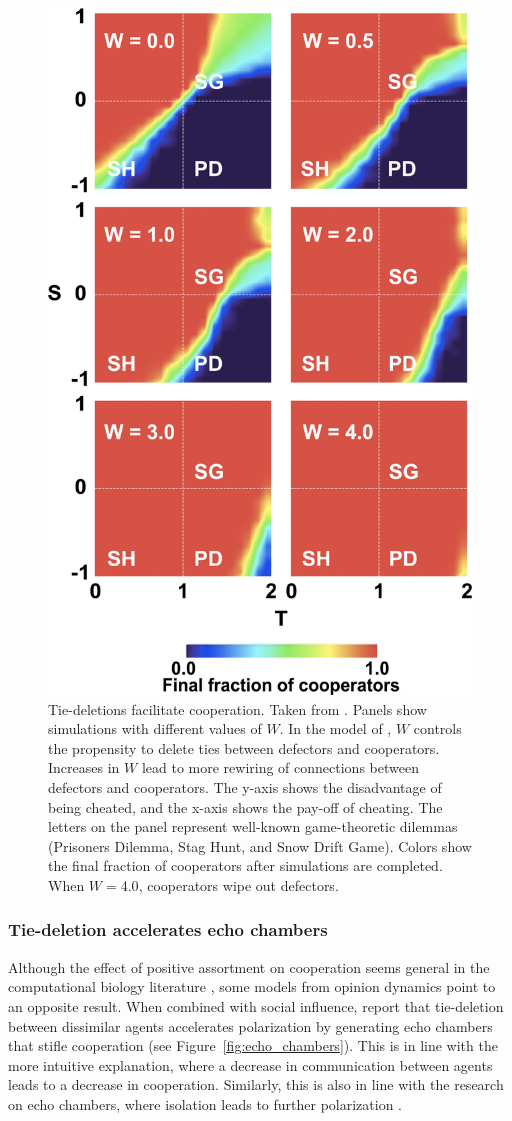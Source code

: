 \documentclass[11pt]{article}
\begin{document}
\begin{figure}[H]
    \centering
    \includegraphics[width=.4\linewidth]{../plots/references/santos.png}
  \caption{Tie-deletions facilitate cooperation. Taken from \protect{}. Panels show simulations with different values of $W$. In the model of \protect{}, $W$ controls the propensity to delete ties between defectors and cooperators. Increases in $W$ lead to more rewiring of connections between defectors and cooperators. The y-axis shows the disadvantage of being cheated, and the x-axis shows the pay-off of cheating. The letters on the panel represent well-known game-theoretic dilemmas (Prisoners Dilemma, Stag Hunt, and Snow Drift Game). Colors show the final fraction of cooperators after simulations are completed. When $W = 4.0$, cooperators wipe out defectors. }
  \label{fig:santos}
\end{figure}

\subsubsection{Tie-deletion accelerates echo chambers}

\noindent Although the effect of positive assortment on cooperation seems general in the computational biology literature \cite{boyd_coordinated_2010,dakin_dynamic_2018,melamed_strong_2016,pepper_mechanism_2002}, some models from opinion dynamics point to an opposite result. When combined with social influence,  report that tie-deletion between dissimilar agents accelerates polarization by generating echo chambers that stifle cooperation (see Figure~\ref{fig:echo_chambers}). This is in line with the more intuitive explanation, where a decrease in communication between agents leads to a decrease in cooperation. Similarly, this is also in line with the research on echo chambers, where isolation leads to further polarization \cite{tsai_echo_2020, del_vicario_echo_2016}. 
\end{document}
